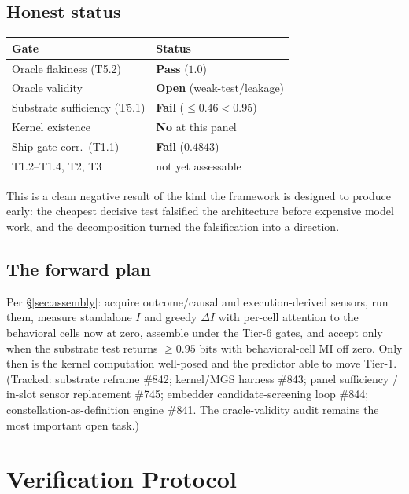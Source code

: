 \documentclass[10pt,twocolumn]{article}
\begin{document}
\subsection{Honest status}
\begin{center}
\small
\begin{tabular}{@{}ll@{}}
\toprule
Gate & Status\\
\midrule
Oracle flakiness (T5.2) & \textbf{Pass} ($1.0$)\\
Oracle validity & \textbf{Open} (weak-test/leakage)\\
Substrate sufficiency (T5.1) & \textbf{Fail} ($\le0.46<0.95$)\\
Kernel existence & \textbf{No} at this panel\\
Ship-gate corr.\ (T1.1) & \textbf{Fail} ($0.4843$)\\
T1.2--T1.4, T2, T3 & not yet assessable\\
\bottomrule
\end{tabular}
\end{center}
This is a clean negative result of the kind the framework is designed to produce
early: the cheapest decisive test falsified the architecture before expensive
model work, and the decomposition turned the falsification into a direction.

\subsection{The forward plan}
Per \S\ref{sec:assembly}: acquire outcome/causal and execution-derived sensors,
run them, measure standalone $I$ and greedy $\Delta I$ with per-cell attention to
the behavioral cells now at zero, assemble under the Tier-6 gates, and accept only
when the substrate test returns $\ge0.95$ bits with behavioral-cell MI off zero.
Only then is the kernel computation well-posed and the predictor able to move
Tier-1. (Tracked: substrate reframe \#842; kernel/MGS harness \#843; panel
sufficiency / in-slot sensor replacement \#745; embedder candidate-screening loop
\#844; constellation-as-definition engine \#841. The oracle-validity audit remains
the most important open task.)

\section{Verification Protocol}
\label{sec:fsv}
\end{document}
